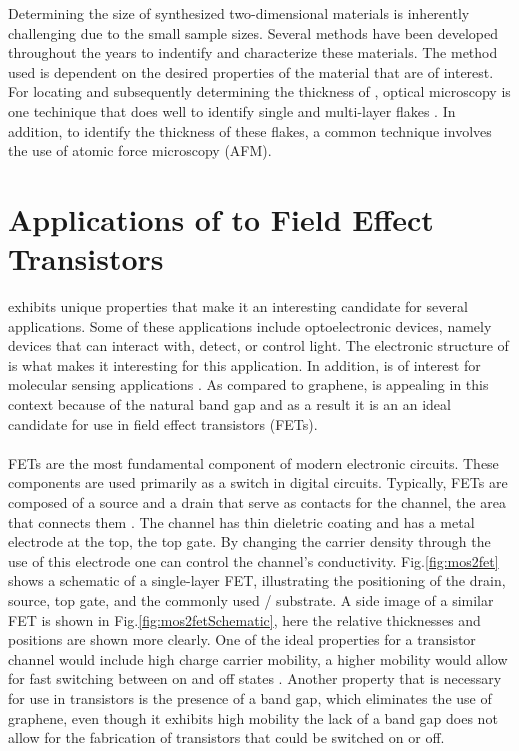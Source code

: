 \documentclass[%
 reprint,
 amsmath,amssymb,
 aps,
pra,
floatfix,
]{revtex4-1}
\begin{document}
Determining the size of synthesized two-dimensional materials is inherently challenging due to the small sample sizes. Several methods have been developed throughout the years to indentify and characterize these materials. The method used is dependent on the desired properties of the material that are of interest. For locating and subsequently determining the thickness of , optical microscopy is one techinique that does well to identify single and multi-layer flakes \cite{acsnanoReview2013}. In addition, to identify the thickness of these flakes, a common technique involves the use of atomic force microscopy (AFM).

\section{\label{sec:mos2_applications} Applications of  to Field Effect Transistors}
 exhibits unique properties that make it an interesting candidate for several applications. Some of these applications include optoelectronic devices, namely devices that can interact with, detect, or control light. The electronic structure of  is what makes it interesting for this application. In addition,  is of interest for molecular sensing applications \cite{Wang2012a}. As compared to graphene,  is appealing in this context because of the natural band gap and as a result it is an an ideal candidate for use in field effect transistors (FETs). \\ \\
FETs are the most fundamental component of modern electronic circuits. These components are used primarily as a switch in digital circuits.  Typically, FETs are composed of a source and a drain that serve as contacts for the channel, the area that connects them \cite{Millman1991}. The channel has thin dieletric coating and has a metal electrode at the top, the top gate. By changing the carrier density through the use of this electrode one can control the channel's conductivity. Fig.\ref{fig:mos2fet} shows a schematic of a single-layer  FET, illustrating the positioning of the drain, source, top gate, and the commonly used / substrate. A side image of a similar FET is shown in Fig.\ref{fig:mos2fetSchematic}, here the relative thicknesses and positions are shown more clearly. One of the ideal properties for a transistor channel would include high charge carrier mobility, a higher mobility would allow for fast switching between on and off states \cite{Lembke2015}. Another property that is necessary for use in transistors is the presence of a band gap, which eliminates the use of graphene, even though it exhibits high mobility the lack of a band gap does not allow for the fabrication of transistors that could be switched on or off. \\ \\
\end{document}
